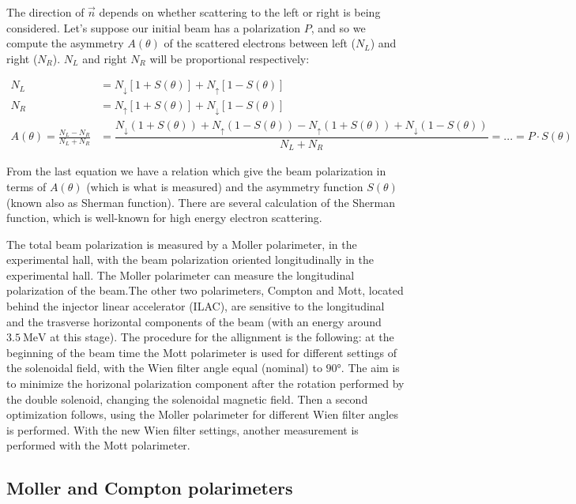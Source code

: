 The direction of $\vec{n}$ depends on whether scattering to the left or right is being considered. Let's suppose our initial beam has a polarization $P$, and so we compute the asymmetry $A(\theta)$ of the scattered electrons between left ($N_{L}$) and right ($N_{R}$). $N_{L}$ and right $N_{R}$ will be proportional respectively:


\begin{align*}
N_{L} &= N_{\downarrow}[1 + S(\theta)] + N_{\uparrow}[1 - S(\theta)] \\
N_{R} &= N_{\uparrow}[1 + S(\theta)] + N_{\downarrow}[1 - S(\theta)]  \\
A(\theta) = \frac{N_{L} - N_{R}}{N_{L} + N_{R}} &= \dfrac{N_{\downarrow}(1 + S(\theta)) + N_{\uparrow}(1 - S(\theta)) - N_{\uparrow}(1 + S(\theta)) + N_{\downarrow}(1 - S(\theta))}{N_{L} + N_{R}} = ... = P \cdot S(\theta)
\end{align*}


From the last equation we have a relation which give the beam polarization in terms of $A(\theta)$ (which is what is measured) and the asymmetry function $S(\theta)$ (known also as Sherman function). There are several calculation of the Sherman function, which is well-known for high energy electron scattering.

The total beam polarization is measured by a Moller polarimeter, in the experimental hall, with the beam polarization oriented longitudinally in the experimental hall. The Moller polarimeter can measure the longitudinal polarization of the beam.The other two polarimeters, Compton and Mott, located behind the injector linear accelerator (ILAC), are sensitive to the longitudinal and the trasverse horizontal components of the beam (with an energy around $\SI{3.5}{\mega \electronvolt}$ at this stage). The procedure for the allignment is the following: at the beginning of the beam time the Mott polarimeter is used for different settings of the solenoidal field, with the Wien filter angle equal (nominal) to $\ang{90}$. The aim is to minimize the horizonal polarization component after the rotation performed by the double solenoid, changing the solenoidal magnetic field. Then a second optimization follows, using the Moller polarimeter for different Wien filter angles is performed. With the new Wien filter settings, another measurement is performed with the Mott polarimeter.

\subsection{Moller and Compton polarimeters}


